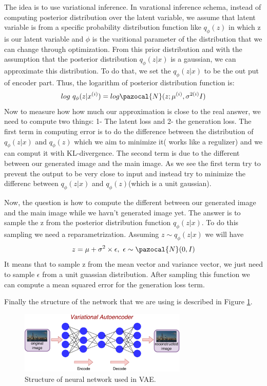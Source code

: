 \documentclass{article} %
\newcommand{\Lb}{\pazocal{N}}
\begin{document}
The idea is to use variational inference. In varational inference schema, instead of computing posterior distribution over the latent variable, we assume that latent variable is from a specific probability distribution function like $q_{\phi}(z)$ in which z is our latent variable and $\phi$ is the varitional parameter of the distribution that we can change through optimization. From this prior distribution and with the assumption that the posterior distribution $q_{\phi}(z|x)$ is a gaussian, we can approximate this  distribution. To do that, we set the $q_{\phi}(z|x)$ to be the out put of encoder part.
Thus, the logarithm of posterior distribution function is:
\begin{equation}
log\ q_{\phi}(z|x^{(i)}) = log \Lb(z; \mu^{(i)}, \sigma^{2(i)}I)
\end{equation}
Now to measure how how much our approximation is close to the real answer, we need to compute two things: 1- The latent loss and 2- the generation loss. The first term in computing error is to do the difference between the distribution of $q_{\phi}(z|x)$ and $q_{\phi}(z)$ which we aim to minimize it( works like a regulizer) and we can comput it with KL-divergence.  The second term is due to the different between our generated image and the main image. As we see the first term try to prevent the output to be very close to input and instead try to minimize the differenc between $q_{\phi}(z|x)$ and $q_{\phi}(z)$(which is a unit gaussian).

Now, the question is how to compute the different between our generated image and the main image while we havn't generated image yet. The answer is to sample the z from the posterior distribution function $q_{\phi}(z|x)$. To do this sampling we need a reparametrization. Assuming $z \sim q_{\phi}(z|x)$ we will have 
\begin{equation}
z = \mu + \sigma^2 \times \epsilon,\ \epsilon \sim \Lb(0, I)
\end{equation}
It means that to sample z from the mean vector and variance vector, we just need to sample $\epsilon$ from a unit guassian distribution. After sampling this function we can compute a mean squared error for the generation loss term.

Finally the structure of the network that we are using is described in Figure \ref{structure}.
\begin{figure}[h]
    \centering
    \includegraphics[width=8cm]{structure.pdf}
    \caption{Structure of neural network used in VAE.}
        \label{structure}
\end{figure}
\end{document}
